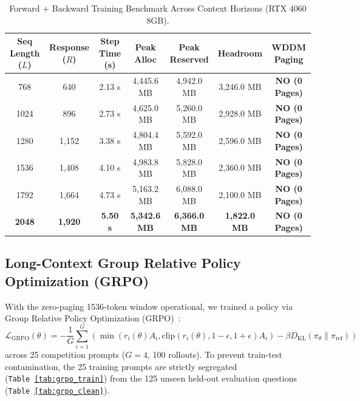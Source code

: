 \documentclass[11pt,a4paper]{article}
\begin{document}
\begin{table}[htbp]
\centering
\caption{Forward + Backward Training Benchmark Across Context Horizons (RTX 4060 8GB).}
\label{tab:vram}
\small
\begin{tabular}{@{}ccccccc@{}}
\toprule
\textbf{Seq Length ($L$)} & \textbf{Response ($R$)} & \textbf{Step Time (s)} & \textbf{Peak Alloc} & \textbf{Peak Reserved} & \textbf{Headroom} & \textbf{WDDM Paging} \\
\midrule
768 & 640 & 2.13 s & 4,445.6 MB & 4,942.0 MB & 3,246.0 MB & \textbf{NO (0 Pages)} \\
1024 & 896 & 2.73 s & 4,625.0 MB & 5,260.0 MB & 2,928.0 MB & \textbf{NO (0 Pages)} \\
1280 & 1,152 & 3.38 s & 4,804.4 MB & 5,592.0 MB & 2,596.0 MB & \textbf{NO (0 Pages)} \\
1536 & 1,408 & 4.10 s & 4,983.8 MB & 5,828.0 MB & 2,360.0 MB & \textbf{NO (0 Pages)} \\
1792 & 1,664 & 4.73 s & 5,163.2 MB & 6,088.0 MB & 2,100.0 MB & \textbf{NO (0 Pages)} \\
\textbf{2048} & \textbf{1,920} & \textbf{5.50 s} & \textbf{5,342.6 MB} & \textbf{6,366.0 MB} & \textbf{1,822.0 MB} & \textbf{NO (0 Pages)} \\
\bottomrule
\end{tabular}
\end{table}

\subsection{Long-Context Group Relative Policy Optimization (GRPO)}

With the zero-paging 1536-token window operational, we trained a policy via Group Relative Policy Optimization (GRPO)~\cite{shao2024deepseekmath}:
\begin{equation}
\mathcal{L}_{\mathrm{GRPO}}(\theta) = -\frac{1}{G} \sum_{i=1}^G \left( \min \left( r_i(\theta) A_i, \mathrm{clip}(r_i(\theta), 1-\epsilon, 1+\epsilon) A_i \right) - \beta D_{\mathrm{KL}}(\pi_\theta \| \pi_{\mathrm{ref}}) \right)
\end{equation}
across 25 competition prompts ($G=4$, 100 rollouts). To prevent train-test contamination, the 25 training prompts are strictly segregated (\texttt{Table~\ref{tab:grpo_train}}) from the 125 unseen held-out evaluation questions (\texttt{Table~\ref{tab:grpo_clean}}).
\end{document}
